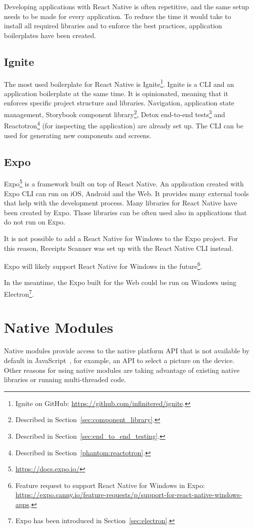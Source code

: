 \documentclass[
  digital, %
  table,   %
  oneside, %
  lof,     %
  lot,     %
]{fithesis3}
\begin{document}
Developing applications with React Native is often repetitive, and the same setup needs to be made for every application. To reduce the time it would take to install all required libraries and to enforce the best practices, application boilerplates have been created.

\subsection{Ignite}
The most used boilerplate for React Native is Ignite\footnote{Ignite on GitHub: \url{https://github.com/infinitered/ignite}.}.
Ignite is a CLI and an application boilerplate at the same time. It is opinionated, meaning that it enforces specific project structure and libraries. Navigation, application state management, Storybook component library\footnote{Described in Section~\ref{sec:component_library}.}, Detox end-to-end tests\footnote{Described in Section~\ref{sec:end_to_end_testing}.} and Reactotron\footnote{Described in Section~\ref{phantom:reactotron}.} (for inspecting the application) are already set up. The CLI can be used for generating new components and screens.

\subsection{Expo}
\label{sec:expo}
Expo\footnote{\url{https://docs.expo.io/}} is a framework built on top of React Native. An application created with Expo CLI can run on iOS, Android and the Web. It provides many external tools that help with the development process. 
Many libraries for React Native have been created by Expo. Those libraries can be often used also in applications that do not run on Expo.

It is not possible to add a React Native for Windows to the Expo project. For this reason, Receipts Scanner was set up with the React Native CLI instead.

Expo will likely support React Native for Windows in the future\footnote{Feature request to support React Native for Windows in Expo: \url{https://expo.canny.io/feature-requests/p/support-for-react-native-windows-apps}.}.

In the meantime, the Expo built for the Web could be run on Windows using Electron\footnote{Expo has been introduced in Section~\ref{sec:electron}.}.

\section{Native Modules}
Native modules provide access to the native platform API that is not available by default in JavaScript~\cite{RNNativeModulesIntro}, for example, an API to select a picture on the device. Other reasons for using native modules are taking advantage of existing native libraries or running multi-threaded code.
\end{document}
